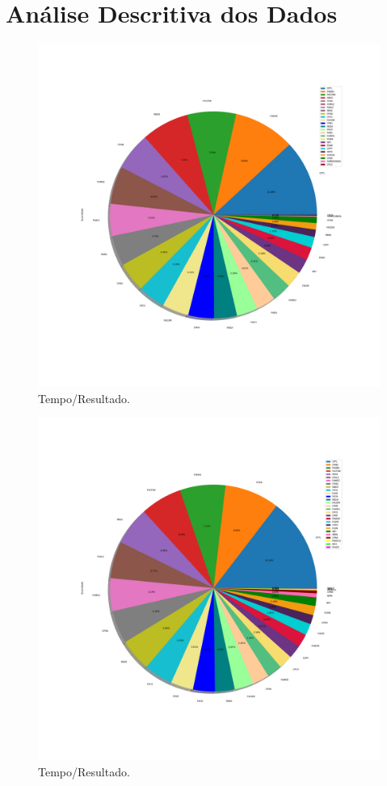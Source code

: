 \documentclass[a4paper, 12pt]{article}
\begin{document}
\section{Análise Descritiva dos Dados}
\begin{figure}[h]
	\centering
	\includegraphics[width=1\textwidth]{../Resultados/img/unidade_pie_2018.pdf}
	\caption{Tempo/Resultado.}
	\label{fig:scatter_topDown}
\end{figure}
\clearpage
\begin{figure}[h]
	\centering
	\includegraphics[width=1\textwidth]{../Resultados/img/unidade_pie_2019.pdf}
	\caption{Tempo/Resultado.}
	\label{fig:scatter_topDown}
\end{figure}
\clearpage
\end{document}
